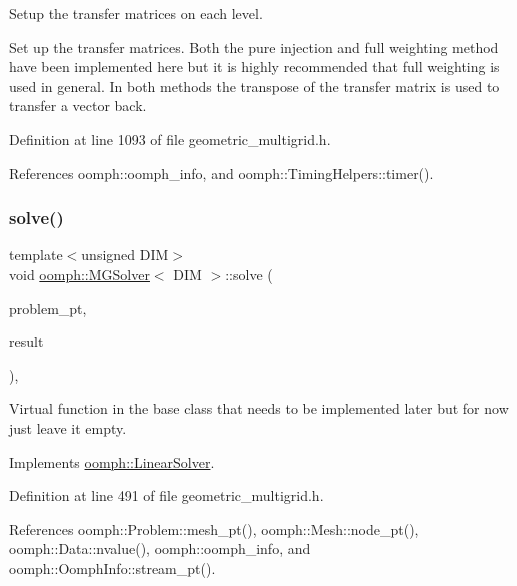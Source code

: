 Setup the transfer matrices on each level. 

Set up the transfer matrices. Both the pure injection and full weighting method have been implemented here but it is highly recommended that full weighting is used in general. In both methods the transpose of the transfer matrix is used to transfer a vector back. 

Definition at line 1093 of file geometric\+\_\+multigrid.\+h.



References oomph\+::oomph\+\_\+info, and oomph\+::\+Timing\+Helpers\+::timer().

\mbox{\label{classoomph_1_1MGSolver_a68f8c874b922c5b67e73c836048e34f5}} 
\subsubsection{\texorpdfstring{solve()}{solve()}}
{\footnotesize\ttfamily template$<$unsigned D\+IM$>$ \\
void \hyperlink{classoomph_1_1MGSolver}{oomph\+::\+M\+G\+Solver}$<$ D\+IM $>$\+::solve (\begin{DoxyParamCaption}\item[{\hyperlink{classoomph_1_1Problem}{Problem} $\ast$const \&}]{problem\+\_\+pt,  }\item[{\hyperlink{classoomph_1_1DoubleVector}{Double\+Vector} \&}]{result }\end{DoxyParamCaption})\hspace{0.3cm}{\ttfamily [inline]}, {\ttfamily [virtual]}}



Virtual function in the base class that needs to be implemented later but for now just leave it empty. 



Implements \hyperlink{classoomph_1_1LinearSolver_a15ce22542b74ed1826ea485edacbeb6e}{oomph\+::\+Linear\+Solver}.



Definition at line 491 of file geometric\+\_\+multigrid.\+h.



References oomph\+::\+Problem\+::mesh\+\_\+pt(), oomph\+::\+Mesh\+::node\+\_\+pt(), oomph\+::\+Data\+::nvalue(), oomph\+::oomph\+\_\+info, and oomph\+::\+Oomph\+Info\+::stream\+\_\+pt().



